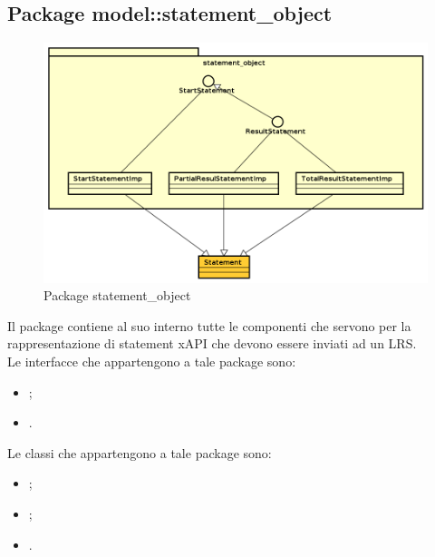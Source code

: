 \documentclass[../Tesi.tex]{subfiles}
\begin{document}
	\subsection{Package model::statement\_object}
		\begin{figure}[H]
			\centering
			\includegraphics[scale=0.6]{images/package_diagrams/statement_object}
				\caption{Package statement\_object}
		\end{figure}
		Il package  contiene al suo interno tutte le componenti che servono per la rappresentazione di statement xAPI che devono essere inviati ad un LRS.\\
		Le interfacce che appartengono a tale package sono:
		\begin{itemize}
			\item {};
			\item {}.
		\end{itemize}
		Le classi che appartengono a tale package sono:
		\begin{itemize}
			\item {};
			\item {};
			\item {}.
		\end{itemize}
\end{document}
